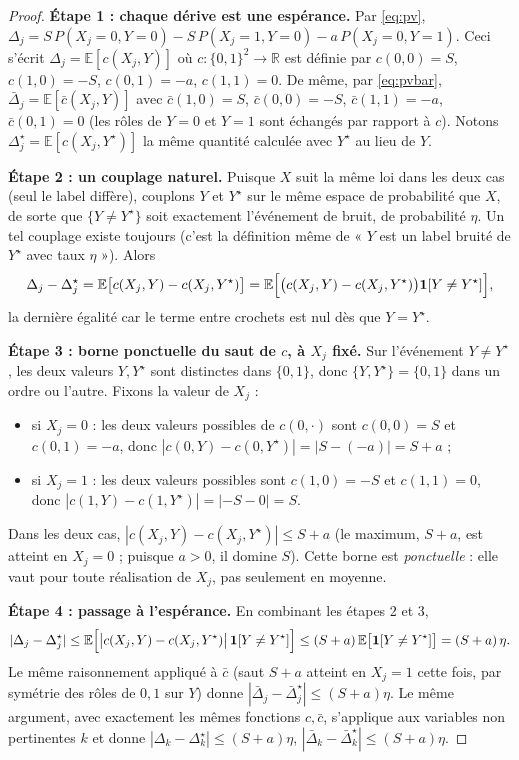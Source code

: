 \documentclass[12pt,a4paper]{article}
\begin{document}
\begin{proof}
\textbf{Étape 1 : chaque dérive est une espérance.}
Par \eqref{eq:pv}, $\Delta_j = S\,P(X_j{=}0,Y{=}0) - S\,P(X_j{=}1,Y{=}0) -
a\,P(X_j{=}0,Y{=}1)$. Ceci s'écrit $\Delta_j=\mathbb E[c(X_j,Y)]$ où
$c:\{0,1\}^2\to\mathbb R$ est définie par $c(0,0)=S$, $c(1,0)=-S$,
$c(0,1)=-a$, $c(1,1)=0$. De même, par \eqref{eq:pvbar},
$\bar\Delta_j=\mathbb E[\bar c(X_j,Y)]$ avec $\bar c(1,0)=S$,
$\bar c(0,0)=-S$, $\bar c(1,1)=-a$, $\bar c(0,1)=0$ (les rôles de $Y{=}0$ et
$Y{=}1$ sont échangés par rapport à $c$). Notons $\Delta_j^\star=\mathbb
E[c(X_j,Y^\star)]$ la même quantité calculée avec $Y^\star$ au lieu de $Y$.

\textbf{Étape 2 : un couplage naturel.}
Puisque $X$ suit la même loi dans les deux cas (seul le label diffère),
couplons $Y$ et $Y^\star$ sur le même espace de probabilité que $X$, de
sorte que $\{Y\ne Y^\star\}$ soit exactement l'événement de bruit, de
probabilité $\eta$. Un tel couplage existe toujours (c'est la définition
même de « $Y$ est un label bruité de $Y^\star$ avec taux $\eta$ »). Alors
\[
  \Delta_j - \Delta_j^\star = \mathbb E\bigl[c(X_j,Y) - c(X_j,Y^\star)\bigr]
  = \mathbb E\Bigl[\bigl(c(X_j,Y)-c(X_j,Y^\star)\bigr)\mathbf 1[Y\ne Y^\star]\Bigr],
\]
la dernière égalité car le terme entre crochets est nul dès que $Y=Y^\star$.

\textbf{Étape 3 : borne ponctuelle du saut de $c$, à $X_j$ fixé.}
Sur l'événement $Y\ne Y^\star$, les deux valeurs $Y,Y^\star$ sont
distinctes dans $\{0,1\}$, donc $\{Y,Y^\star\}=\{0,1\}$ dans un ordre ou
l'autre. Fixons la valeur de $X_j$ :
\begin{itemize}
  \item si $X_j=0$ : les deux valeurs possibles de $c(0,\cdot)$ sont
  $c(0,0)=S$ et $c(0,1)=-a$, donc $|c(0,Y)-c(0,Y^\star)|=|S-(-a)|=S+a$ ;
  \item si $X_j=1$ : les deux valeurs possibles sont $c(1,0)=-S$ et
  $c(1,1)=0$, donc $|c(1,Y)-c(1,Y^\star)|=|{-S}-0|=S$.
\end{itemize}
Dans les deux cas, $|c(X_j,Y)-c(X_j,Y^\star)|\le S+a$ (le maximum, $S+a$,
est atteint en $X_j=0$ ; puisque $a>0$, il domine $S$). Cette borne est
\emph{ponctuelle} : elle vaut pour toute réalisation de $X_j$, pas
seulement en moyenne.

\textbf{Étape 4 : passage à l'espérance.}
En combinant les étapes 2 et 3,
\[
  |\Delta_j-\Delta_j^\star| \le \mathbb E\Bigl[\bigl|c(X_j,Y)-c(X_j,Y^\star)\bigr|\,\mathbf 1[Y\ne Y^\star]\Bigr]
  \le (S+a)\,\mathbb E\bigl[\mathbf 1[Y\ne Y^\star]\bigr] = (S+a)\,\eta.
\]
Le même raisonnement appliqué à $\bar c$ (saut $S+a$ atteint en $X_j=1$
cette fois, par symétrie des rôles de $0,1$ sur $Y$) donne
$|\bar\Delta_j-\bar\Delta_j^\star|\le(S+a)\eta$. Le même argument, avec
exactement les mêmes fonctions $c,\bar c$, s'applique aux variables non
pertinentes $k$ et donne $|\Delta_k-\Delta_k^\star|\le(S+a)\eta$,
$|\bar\Delta_k-\bar\Delta_k^\star|\le(S+a)\eta$.


\end{proof}
\end{document}
